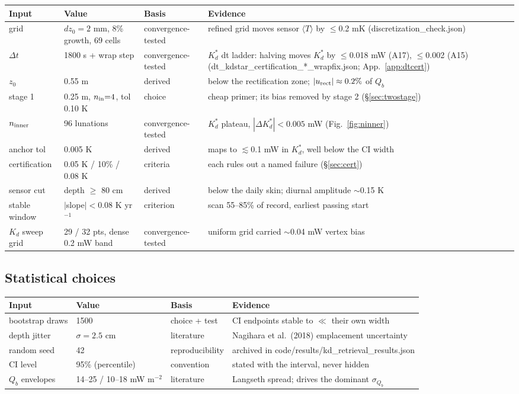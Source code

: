 \documentclass[11pt]{report}
\newcommand{\Tm}{\langle T\rangle}
\newcommand{\code}[1]{{\ttfamily\small #1}}
\begin{document}
\begin{center}\footnotesize
\begin{tabular}{@{}llll@{}}
\toprule
Input & Value & Basis & Evidence \\
\midrule
grid & $dz_0{=}2$ mm, 8\% growth, 69 cells & convergence-tested & refined grid moves sensor $\Tm$ by $\leq$0.2 mK (\code{discretization\_check.json}) \\
$\Delta t$ & 1800 s + wrap step & convergence-tested & $K_d^{*}$ dt ladder: halving moves $K_d^{*}$ by $\leq$0.018 mW (A17), $\leq$0.002 (A15) (\code{dt\_kdstar\_certification\_*\_wrapfix.json}; App.~\ref{app:dtcert}) \\
$z_0$ & 0.55 m & derived & below the rectification zone; $|u_{\rm rect}|\approx0.2\%$ of $Q_b$ \\
stage 1 & 0.25 m, $n_{\rm in}{=}4$, tol 0.10 K & choice & cheap primer; its bias removed by stage 2 (\S\ref{sec:twostage}) \\
$n_{\rm inner}$ & 96 lunations & convergence-tested & $K_d^{*}$ plateau, $|\Delta K_d^{*}|<0.005$ mW (Fig.~\ref{fig:ninner}) \\
anchor tol & 0.005 K & derived & maps to $\lesssim$0.1 mW in $K_d^{*}$, well below the CI width \\
certification & 0.05 K / 10\% / 0.08 K & criteria & each rules out a named failure (\S\ref{sec:cert}) \\
sensor cut & depth $\geq$ 80 cm & derived & below the daily skin; diurnal amplitude $\sim$0.15 K \\
stable window & $|$slope$| < 0.08$ K yr$^{-1}$ & criterion & scan 55--85\% of record, earliest passing start \\
$K_d$ sweep grid & 29 / 32 pts, dense 0.2 mW band & convergence-tested & uniform grid carried ${\sim}$0.04 mW vertex bias \\
\bottomrule
\end{tabular}
\end{center}

\subsection*{Statistical choices}

\begin{center}\footnotesize
\begin{tabular}{@{}llll@{}}
\toprule
Input & Value & Basis & Evidence \\
\midrule
bootstrap draws & 1500 & choice + test & CI endpoints stable to $\ll$ their own width \\
depth jitter & $\sigma = 2.5$ cm & literature & Nagihara et al.\ (2018) emplacement uncertainty \\
random seed & 42 & reproducibility & archived in \code{code/results/kd\_retrieval\_results.json} \\
CI level & 95\% (percentile) & convention & stated with the interval, never hidden \\
$Q_b$ envelopes & 14--25 / 10--18 mW m$^{-2}$ & literature & Langseth spread; drives the dominant $\sigma_{Q_b}$ \\
\bottomrule
\end{tabular}
\end{center}
\end{document}
